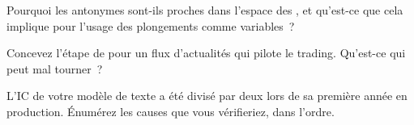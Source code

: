\begin{interviewq}\label{iq:ml:text-from-bag-of-words-to-embeddings:4}
Pourquoi les antonymes sont-ils proches dans l'espace des , et qu'est-ce que cela implique pour l'usage des plongements comme variables~?
\end{interviewq}

\begin{interviewq}\label{iq:ml:text-from-bag-of-words-to-embeddings:5}
Concevez l'étape de  pour un flux d'actualités qui pilote le trading. Qu'est-ce qui peut mal tourner~?
\end{interviewq}

\begin{interviewq}\label{iq:ml:text-from-bag-of-words-to-embeddings:6}
L'IC de votre modèle de texte a été divisé par deux lors de sa première année en production. Énumérez les causes que vous vérifieriez, dans l'ordre.
\end{interviewq}
